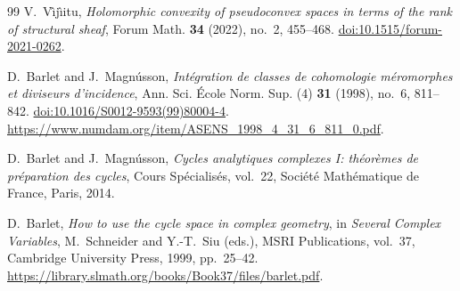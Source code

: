 \documentclass[11pt]{amsart}
\theoremstyle{definition}
\theoremstyle{remark}
\numberwithin{equation}{section}
\begin{document}
\begin{thebibliography}{99}
V.~V\^{\i}j\^{\i}itu,
\emph{Holomorphic convexity of pseudoconvex spaces in terms of
the rank of structural sheaf},
Forum Math. \textbf{34} (2022), no.~2, 455--468.
\href{https://doi.org/10.1515/forum-2021-0262}{doi:10.1515/forum-2021-0262}.

D.~Barlet and J.~Magn\'usson,
\emph{Int\'egration de classes de cohomologie m\'eromorphes et
diviseurs d'incidence},
Ann. Sci. \'Ecole Norm. Sup. (4) \textbf{31} (1998),
no.~6, 811--842.
\href{https://doi.org/10.1016/S0012-9593(99)80004-4}
{doi:10.1016/S0012-9593(99)80004-4}.
\url{https://www.numdam.org/item/ASENS_1998_4_31_6_811_0.pdf}.

D.~Barlet and J.~Magn\'usson,
\emph{Cycles analytiques complexes I: th\'eor\`emes de
pr\'eparation des cycles},
Cours Sp\'ecialis\'es, vol.~22,
Soci\'et\'e Math\'ematique de France, Paris, 2014.

D.~Barlet, \emph{How to use the cycle space in complex geometry},
in \emph{Several Complex Variables},
M.~Schneider and Y.-T.~Siu (eds.),
MSRI Publications, vol.~37, Cambridge University Press, 1999,
pp.~25--42.
\url{https://library.slmath.org/books/Book37/files/barlet.pdf}.

\end{thebibliography}
\end{document}
